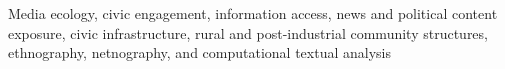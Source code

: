 
 \begin{small} \color{black} 
 Media ecology, civic engagement, information access, news and political content exposure, civic infrastructure, rural and post-industrial community structures, ethnography, netnography, and computational textual analysis
 \end{small}

